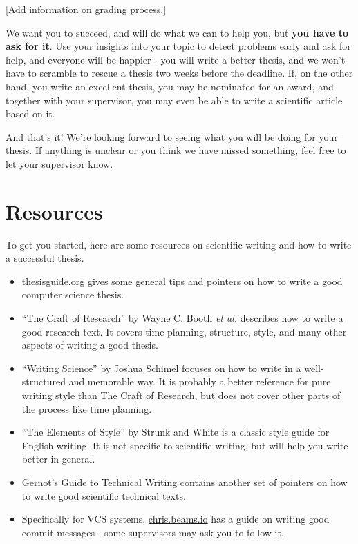 \documentclass[a4paper, 11pt, hidelinks]{article}
\begin{document}
[Add information on grading process.]

We want you to succeed, and will do what we can to help you, but \textbf{you have to ask for it}.
Use your insights into your topic to detect problems early and ask for help, and everyone will be happier - you will write a better thesis, and we won’t have to scramble to rescue a thesis two weeks before the deadline.
If, on the other hand, you write an excellent thesis, you may be nominated for an award, and together with your supervisor, you may even be able to write a scientific article based on it.

And that’s it! We’re looking forward to seeing what you will be doing for your thesis.
If anything is unclear or you think we have missed something, feel free to let your supervisor know.


\section*{Resources}
To get you started, here are some resources on scientific writing and how to write a successful thesis.

\begin{itemize}
	\item \href{https://thesisguide.org}{thesisguide.org} gives some general tips and pointers on how to write a good computer science thesis.
	\item ``The Craft of Research'' by Wayne C. Booth \emph{et al.} describes how to write a good research text. It covers time planning, structure, style, and many other aspects of writing a good thesis.
	\item ``Writing Science'' by Joshua Schimel focuses on how to write in a well-structured and memorable way. It is probably a better reference for pure writing style than The Craft of Research, but does not cover other parts of the process like time planning.
	\item ``The Elements of Style'' by Strunk and White is a classic style guide for English writing. It is not specific to scientific writing, but will help you write better in general.
	\item \href{https://www.cse.unsw.edu.au/~gernot/style-guide.html}{Gernot's Guide to Technical Writing} contains another set of pointers on how to write good scientific technical texts.
	\item Specifically for VCS systems, \href{https://chris.beams.io/posts/git-commit/}{chris.beams.io} has a guide on writing good commit messages - some supervisors may ask you to follow it.
\end{itemize}
\end{document}
